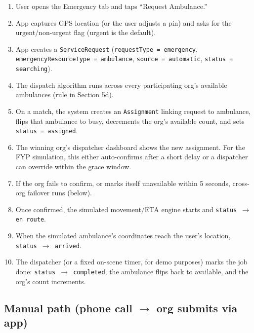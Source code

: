 \documentclass[11pt,a4paper]{article}
\begin{document}
\begin{enumerate}
  \item User opens the Emergency tab and taps ``Request Ambulance.''
  \item App captures GPS location (or the user adjusts a pin) and asks for the urgent/non-urgent flag (urgent is the default).
  \item App creates a \texttt{ServiceRequest} (\texttt{requestType = emergency}, \texttt{emergencyResourceType = ambulance}, \texttt{source = automatic}, \texttt{status = searching}).
  \item The dispatch algorithm runs across every participating org's available ambulances (rule in Section 5d).
  \item On a match, the system creates an \texttt{Assignment} linking request to ambulance, flips that ambulance to busy, decrements the org's available count, and sets \texttt{status = assigned}.
  \item The winning org's dispatcher dashboard shows the new assignment. For the FYP simulation, this either auto-confirms after a short delay or a dispatcher can override within the grace window.
  \item If the org fails to confirm, or marks itself unavailable within 5 seconds, cross-org failover runs (below).
  \item Once confirmed, the simulated movement/ETA engine starts and \texttt{status $\rightarrow$ en route}.
  \item When the simulated ambulance's coordinates reach the user's location, \texttt{status $\rightarrow$ arrived}.
  \item The dispatcher (or a fixed on-scene timer, for demo purposes) marks the job done: \texttt{status $\rightarrow$ completed}, the ambulance flips back to available, and the org's count increments.
\end{enumerate}

\subsection{Manual path (phone call $\rightarrow$ org submits via app)}
\end{document}
